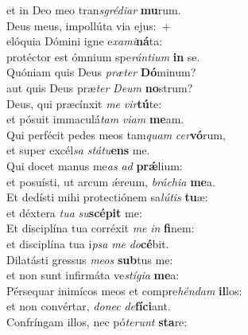 \evenverse et in Deo meo tran\textit{sgré}\textit{di}\textit{ar} \textbf{mu}rum.\\
\oddverse Deus meus, impollúta via ejus:~+\\
\oddverse  elóquia Dómini igne e\textit{xa}\textit{mi}\textbf{ná}ta:~\*\\
\oddverse protéctor est ómnium spe\textit{rán}\textit{ti}\textit{um} \textbf{in} se.\\
\evenverse Quóniam quis Deus \textit{præ}\textit{ter} \textbf{Dó}minum?~\*\\
\evenverse aut quis Deus præ\textit{ter} \textit{De}\textit{um} \textbf{no}strum?\\
\oddverse Deus, qui præcínxit \textit{me} \textit{vir}\textbf{tú}te:~\*\\
\oddverse et pósuit immaculá\textit{tam} \textit{vi}\textit{am} \textbf{me}am.\\
\evenverse Qui perfécit pedes meos tam\textit{quam} \textit{cer}\textbf{vó}rum,~\*\\
\evenverse et super excél\textit{sa} \textit{stá}\textit{tu}\textbf{ens} me.\\
\oddverse Qui docet manus me\textit{as} \textit{ad} \textbf{prǽ}lium:~\*\\
\oddverse et posuísti, ut arcum ǽreum, \textit{brá}\textit{chi}\textit{a} \textbf{me}a.\\
\evenverse Et dedísti mihi protectiónem sa\textit{lú}\textit{tis} \textbf{tu}æ:~\*\\
\evenverse et déxtera \textit{tu}\textit{a} \textit{su}\textbf{scé}\textbf{pit} me:\\
\oddverse Et disciplína tua corréxit \textit{me} \textit{in} \textbf{fi}nem:~\*\\
\oddverse et disciplína tua i\textit{psa} \textit{me} \textit{do}\textbf{cé}bit.\\
\evenverse Dilatásti gressus \textit{me}\textit{os} \textbf{sub}tus me:~\*\\
\evenverse et non sunt infirmáta ve\textit{stí}\textit{gi}\textit{a} \textbf{me}a:\\
\oddverse Pérsequar inimícos meos et compre\textit{hén}\textit{dam} \textbf{il}los:~\*\\
\oddverse et non convértar, \textit{do}\textit{nec} \textit{de}\textbf{fí}\textbf{ci}ant.\\
\evenverse Confríngam illos, nec pó\textit{te}\textit{runt} \textbf{sta}re:~\*\\
